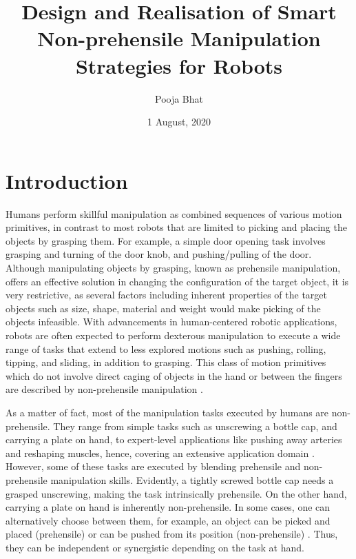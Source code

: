 \documentclass[rnd]{mas_proposal}
\title{Design and Realisation of Smart Non-prehensile Manipulation Strategies for Robots
}
\author{Pooja Bhat}
\date{1 August, 2020}
\begin{document}
\maketitle

\pagestyle{plain}

\section{Introduction}
%
    
        
Humans perform skillful manipulation as combined sequences of various motion primitives, in contrast to most robots that are limited to picking and placing the objects by grasping them. For example, a simple door opening task involves grasping and turning of the door knob, and pushing/pulling of the door. Although manipulating objects by grasping, known as prehensile manipulation, offers an effective solution in changing the configuration of the target object, it is very restrictive, as several factors including inherent properties of the target objects such as size, shape, material and weight would make picking of the objects infeasible. With advancements in human-centered robotic applications, robots are often expected to perform dexterous manipulation to execute a  wide range of tasks that extend to less explored motions such as pushing, rolling, tipping, and sliding, in addition to grasping. This class of motion primitives which do not involve direct caging of objects in the hand or between the fingers are described by non-prehensile manipulation \cite{serra2016robot}.

As a matter of fact, most of the manipulation tasks executed by humans are non-prehensile. They range from simple tasks such as unscrewing a bottle cap, and carrying a plate on hand, to expert-level applications like pushing away arteries and reshaping muscles, hence, covering an extensive application domain \cite{serra2016robot,ruggiero2018nonprehensile}. However, some of these tasks are executed by blending prehensile and non-prehensile manipulation skills. Evidently, a tightly screwed bottle cap needs a grasped unscrewing, making the task intrinsically prehensile. On the other hand, carrying a plate on hand is inherently non-prehensile. In some cases, one can alternatively choose between them, for example, an object can be picked and placed (prehensile) or can be pushed from its position (non-prehensile) \cite{ruggiero2018nonprehensile}. Thus, they can be independent or synergistic depending on the task at hand.
\end{document}
